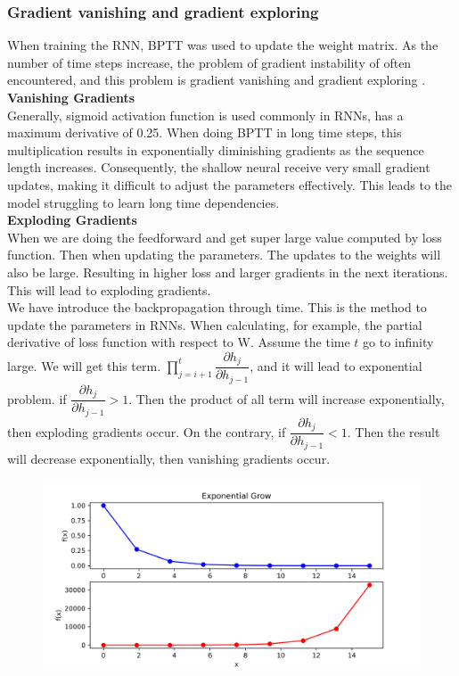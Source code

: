 \documentclass[12pt,a4paper]{article}
\begin{document}
\subsubsection{Gradient vanishing and gradient exploring}
When training the RNN, BPTT was used to update the weight matrix. As the number of time steps increase, the problem of gradient instability of often encountered, and this problem is gradient vanishing and gradient exploring \parencite{bengio1994learning}. 
\\[2ex]
\textbf{Vanishing Gradients}
\\[1ex]
Generally, sigmoid activation function is used commonly in RNNs, has a maximum derivative of 0.25. When doing BPTT in long time steps, this multiplication results in exponentially diminishing gradients as the sequence length increases. Consequently, the shallow neural receive very small gradient updates, making it difficult to adjust the parameters effectively. This leads to the model struggling to learn long time dependencies. 
\\[1ex]
\textbf{Exploding Gradients}
\\[1ex]
When we are doing the feedforward and get super large value computed by loss function. Then when updating the parameters. The updates to the weights will also be large. Resulting in higher loss and larger gradients in the next iterations. This will lead to exploding gradients.
\\[1ex]
We have introduce the backpropagation through time. This is the method to update the parameters in RNNs. When calculating, for example, the partial derivative of loss function with respect to W. Assume the time $t$ go to infinity large. We will get this term. $ \prod_{j=i+1}^{t} \dfrac{\partial h_j}{\partial h_{j-1}} $, and it will lead to exponential problem. if $ \dfrac{\partial h_j}{\partial h_{j-1}} > 1 $. Then the product of all term will increase exponentially, then exploding gradients occur. On the contrary, if $\dfrac{\partial h_j}{\partial h_{j-1}} < 1$. Then the result will decrease exponentially, then vanishing gradients occur.
\begin{figure}[!htb]
    \centering
    \includegraphics[width=1\textwidth]{../Pic/exponential_growth.png} %
\end{figure}
\end{document}
